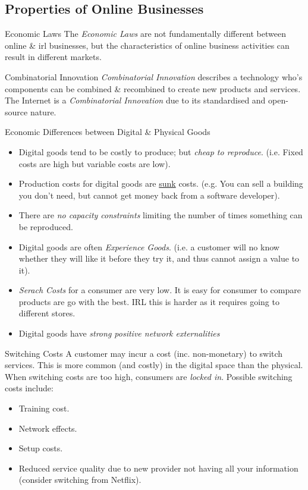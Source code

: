 \documentclass[11pt,a4paper]{article}
\begin{document}
\subsection{Properties of Online Businesses}

  \begin{remark}{Economic Laws}
    The \textit{Economic Laws} are not fundamentally different between online \& irl businesses, but the characteristics of online business activities can result in different markets.
  \end{remark}

  \begin{definition}{Combinatorial Innovation}
    \textit{Combinatorial Innovation} describes a technology who's components can be combined \& recombined to create new products and services. The Internet is a \textit{Combinatorial Innovation} due to its standardised and open-source nature.
  \end{definition}

  \begin{proposition}{Economic Differences between Digital \& Physical Goods}
    \begin{itemize}
      \item Digital goods tend to be costly to produce; but \textit{cheap to reproduce}. (i.e. Fixed costs are high but variable costs are low).
      \item Production costs for digital goods are \underline{sunk} costs. (e.g. You can sell a building you don't need, but cannot get money back from a software developer).
      \item There are \textit{no capacity constraints} limiting the number of times something can be reproduced.
      \item Digital goods are often \textit{Experience Goods}. (i.e. a customer will no know whether they will like it before they try it, and thus cannot assign a value to it).
      \item \textit{Serach Costs} for a consumer are very low. It is easy for consumer to compare products are go with the best. IRL this is harder as it requires going to different stores.
      \item Digital goods have \textit{strong positive network externalities}
    \end{itemize}
  \end{proposition}

  \begin{remark}{Switching Costs}
    A customer may incur a cost (inc. non-monetary) to switch services. This is more common (and costly) in the digital space than the physical. When switching costs are too high, consumers are \textit{locked in}. Possible switching costs include:
    \begin{itemize}
      \item Training cost.
      \item Network effects.
      \item Setup costs.
      \item Reduced service quality due to new provider not having all your information (consider switching from Netflix).
    \end{itemize}
  \end{remark}
\end{document}
